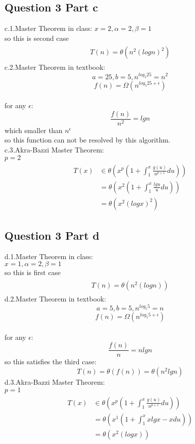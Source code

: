 \documentclass[paper=a4, fontsize=11pt]{scrartcl} %
\numberwithin{equation}{section} %
\numberwithin{figure}{section} %
\numberwithin{table}{section} %
\begin{document}
\subsection{Question 3 Part c}
c.1.Master Theorem in class:
$x=2, \alpha=2,\beta=1$\\
so this is second case
\begin{align*}
\begin{split}
T(n)=\theta(n^{2}(log n)^{2})
\end{split}
\end{align*}
c.2.Master Theorem in textbook:\\
$$a=25, b=5, n^{log_5 25}=n^2$$
$$f(n)=\Omega({n^{log_5 25+\epsilon}})$$\\
for any $\epsilon:$\\
$$ \frac{f(n)}{n^2}=lgn $$
which smaller than $ n^{\epsilon}$\\
so this function can not be resolved by this algorithm.\\
c.3.Akra-Bazzi Master Theorem:\\
$p=2$
\begin{align*}
\begin{split}
T(x) &\in\theta(x^p(1+\int_{1}^{x}{\frac{g(u)}{u^{p+1}}du}))\\
&=\theta({x}^{2}(1+\int_{1}^{x}{\frac{lgu}{u}du}))\\
&=\theta(x^{2}(log x)^{2})
\end{split}
\end{align*}

\subsection{Question 3 Part d}
d.1.Master Theorem in class:\\
$x=1,\alpha=2, \beta=1$\\
so this is first case
\begin{align*}
\begin{split}
T(n)=\theta(n^{2}(log n))
\end{split}
\end{align*}
d.2.Master Theorem in textbook:\\
$$a=5, b=5, n^{log_5 5}=n$$
$$f(n)=\Omega({n^{log_5 5+\epsilon}})$$\\
for any $\epsilon:$\\
$$ \frac{f(n)}{n}=nlgn $$
so this satisfies the third case:
$$ T(n)=\theta(f(n))=\theta{(n^2lgn)} $$
d.3.Akra-Bazzi Master Theorem:\\
$p=1$
\begin{align*}
\begin{split}
T(x) &\in\theta(x^p(1+\int_{1}^{x}{\frac{g(u)}{u^{p+1}}du}))\\
&=\theta({x}^{1}(1+\int_{1}^{x}{{xlgx-x}du}))\\
&=\theta(x^{2}(log x))\\
\end{split}
\end{align*}
\end{document}
